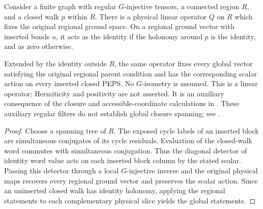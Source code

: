 \begin{lemma}%
    \label{lem:peps_regular_region_holonomy_filter}
    \leanok
    Consider a finite graph with regular $G$-injective tensors, a
    connected region $R$, and a closed walk $p$ within $R$. There
    is a physical linear operator $Q$ on $R$ which fixes the
    original regional ground space. On a regional ground vector
    with inserted bonds $u$, it acts as the identity if the
    holonomy around $p$ is the identity, and as zero otherwise.

    Extended by the identity outside $R$, the same operator fixes
    every global vector satisfying the original regional parent
    condition and has the corresponding scalar action on every
    inserted closed PEPS. No $G$-isometry is assumed.
    This is a linear operator; Hermiticity and positivity are
    not asserted. It is an auxiliary consequence of the closure
    and accessible-coordinate calculations in
    \cite[Theorem~5.5]{Schuch2010PEPS}.
    These auxiliary regular filters do not establish global closure spanning; see
    \cite{gap:rmp_peps_quantum_double_g_isometry}.
\end{lemma}

\begin{proof}\leanok
    Choose a spanning tree of $R$. The exposed cycle labels of an
    inserted block are simultaneous conjugates of its cycle
    residuals. Evaluation of the closed-walk word commutes with
    simultaneous conjugation. Thus the diagonal detector of
    identity word value acts on each inserted block column by the
    stated scalar. Passing this detector through a local
    $G$-injective inverse and the original physical maps recovers every regional
    ground vector and preserves the scalar action. Since an uninserted closed
    walk has identity holonomy, applying the regional statements to each
    complementary physical slice yields the global statements.
\end{proof}

